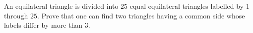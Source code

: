An equilateral triangle is divided into $25$ equal equilateral triangles labelled by $1$ through $25$. Prove that one can find two triangles having a common side whose labels differ by more than $3$.
